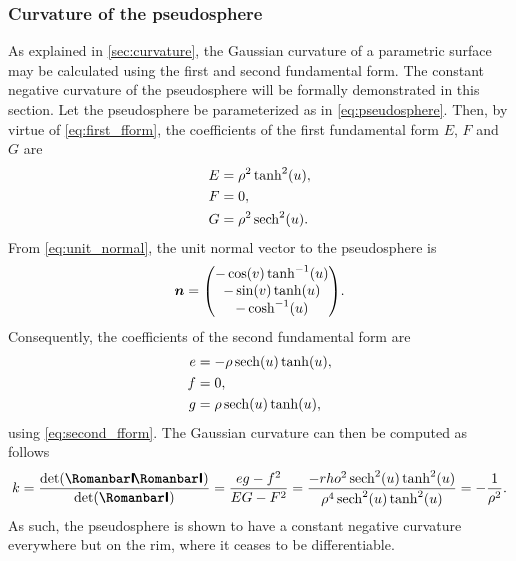 \subsubsection{Curvature of the pseudosphere}
As explained in \cref{sec:curvature}, the Gaussian curvature of a parametric surface may be calculated using the first and second fundamental form. The constant negative curvature of the pseudosphere  will be formally demonstrated in this section. 
Let the pseudosphere be parameterized as in \cref{eq:pseudosphere}. Then, by virtue of \cref{eq:first_fform}, the coefficients of the first fundamental form \(E\), \(F\) and \(G\) are
\[
    \begin{split}
        E & = \rho^2\tanh[2](u), \\
        F & = 0, \\
        G & = \rho^2\sech[2](u). \\
    \end{split}
\]
From \cref{eq:unit_normal}, the unit normal vector to the pseudosphere is
\[
    \vec{n} 
    = \mqty(
        -\cos(v)\tanh[-1](u) \\
        -\sin(v)\tanh(u)\\
        -\cosh[-1](u)\\
    ).
\]
Consequently, the coefficients of the second fundamental form are
\begin{equation*}
    \begin{split}
        e &= -\rho\sech(u)\tanh(u),\\
        f &= 0,\\
        g &= \rho\sech(u)\tanh(u),\\
    \end{split}
\end{equation*}
using \cref{eq:second_fform}.
The Gaussian curvature can then be computed as follows \cite{ONeill2006}
\begin{equation}
    k = \frac{\det(\secondff)}{\det(\firstff)} = \frac{eg - f^2}{EG - F^2} 
    = \frac{-
    rho^2\sech[2](u)\tanh[2](u)}{\rho^4\sech[2](u)\tanh[2](u)} = -\frac{1}{\rho^2}.
\end{equation}
As such, the pseudosphere is shown to have a constant negative curvature everywhere but on the rim, where it ceases to be differentiable.

